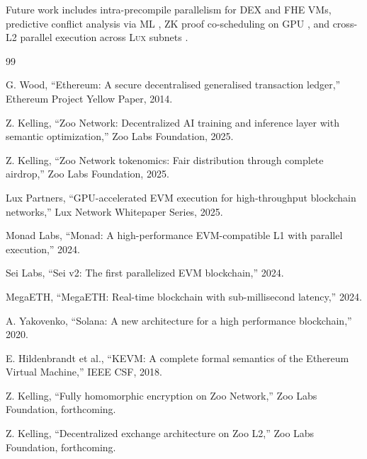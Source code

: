 \documentclass[11pt,letterpaper]{article}
\theoremstyle{definition}
\theoremstyle{remark}
\newcommand{\Lux}{\textsc{Lux}}
\begin{document}
Future work includes intra-precompile parallelism for DEX and FHE VMs, predictive conflict analysis via ML \cite{zoo-tokenomics}, ZK proof co-scheduling on GPU \cite{zoo-fhe}, and cross-L2 parallel execution across \Lux{} subnets \cite{zoo-dex}.

\begin{thebibliography}{99}

G. Wood, ``Ethereum: A secure decentralised generalised transaction ledger,'' Ethereum Project Yellow Paper, 2014.

Z. Kelling, ``Zoo Network: Decentralized AI training and inference layer with semantic optimization,'' Zoo Labs Foundation, 2025.

Z. Kelling, ``Zoo Network tokenomics: Fair distribution through complete airdrop,'' Zoo Labs Foundation, 2025.

Lux Partners, ``GPU-accelerated EVM execution for high-throughput blockchain networks,'' Lux Network Whitepaper Series, 2025.

Monad Labs, ``Monad: A high-performance EVM-compatible L1 with parallel execution,'' 2024.

Sei Labs, ``Sei v2: The first parallelized EVM blockchain,'' 2024.

MegaETH, ``MegaETH: Real-time blockchain with sub-millisecond latency,'' 2024.

A. Yakovenko, ``Solana: A new architecture for a high performance blockchain,'' 2020.

E. Hildenbrandt et al., ``KEVM: A complete formal semantics of the Ethereum Virtual Machine,'' IEEE CSF, 2018.

Z. Kelling, ``Fully homomorphic encryption on Zoo Network,'' Zoo Labs Foundation, forthcoming.

Z. Kelling, ``Decentralized exchange architecture on Zoo L2,'' Zoo Labs Foundation, forthcoming.

\end{thebibliography}
\end{document}
